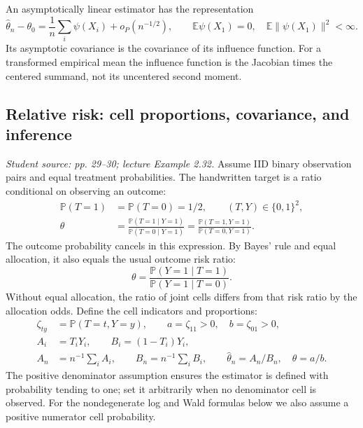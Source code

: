 \documentclass[12pt]{article}
\newcommand{\E}{\mathbb E}
\newcommand{\Prob}{\mathbb P}
\begin{document}
An asymptotically linear estimator has the representation
\begin{equation}
 \widehat\theta_n-\theta_0=\frac1n\sum_i\psi(X_i)+o_P(n^{-1/2}),
 \qquad\E\psi(X_1)=0,\quad\E\|\psi(X_1)\|^2<\infty.
\end{equation}
Its asymptotic covariance is the covariance of its influence function.
For a transformed empirical mean the influence function is the Jacobian
times the centered summand, not its uncentered second moment.

\subsection{Relative risk: cell proportions, covariance, and inference}
\textit{Student source: pp. 29--30; lecture Example 2.32.}
Assume IID binary observation pairs and equal treatment probabilities.
The handwritten target is a ratio conditional on observing an outcome:
\begin{align}
 \Prob(T=1)&=\Prob(T=0)=1/2,\qquad (T,Y)\in\{0,1\}^2,\\
 \theta&=\frac{\Prob(T=1\mid Y=1)}{\Prob(T=0\mid Y=1)}
 =\frac{\Prob(T=1,Y=1)}{\Prob(T=0,Y=1)}.
\end{align}
The outcome probability cancels in this expression. By Bayes' rule and
equal allocation, it also equals the usual outcome risk ratio:
\begin{equation}
 \theta=\frac{\Prob(Y=1\mid T=1)}{\Prob(Y=1\mid T=0)}.
\end{equation}
Without equal allocation, the ratio of joint cells differs from that risk
ratio by the allocation odds. Define the cell indicators and proportions:
\begin{align}
 \zeta_{ty}&=\Prob(T=t,Y=y),\qquad
 a=\zeta_{11}>0,\quad b=\zeta_{01}>0,\\
 A_i&=T_iY_i,\qquad B_i=(1-T_i)Y_i,\\
 A_n&=n^{-1}\sum_i A_i,\qquad B_n=n^{-1}\sum_i B_i,
 \qquad\widehat\theta_n=A_n/B_n,\quad\theta=a/b.
\end{align}
The positive denominator assumption ensures the estimator is defined with
probability tending to one; set it arbitrarily when no denominator cell
is observed. For the nondegenerate log and Wald formulas below we also
assume a positive numerator cell probability.
\end{document}
